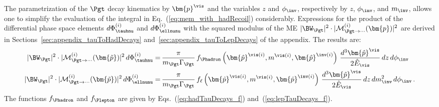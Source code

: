 The parametrization of the $\Pgt$ decay kinematics by $\bm{p}^{\vis}$
and the variables $z$ and $\phi_{\inv}$, respectively by $z$, $\phi_{\inv}$, and $m_{\inv}$,
allows one to simplify the evaluation of the integral in Eq.~(\ref{eq:mem_with_hadRecoil}) considerably.
Expressions for the product of the differential phase space elements
$d\Phi^{(i)}_{\tauhnu}$  and $d\Phi^{(i)}_{\ellnunu}$ with the squared
modulus of the ME $\vert \BW_{\Pgt} \vert^{2} \cdot \vert \mathcal{M}^{(i)}_{\Pgt\to\cdots}(\bm{p}) \vert^{2}$ are derived in Sections~\ref{sec:appendix_tauToHadDecays} and~\ref{sec:appendix_tauToLepDecays} of the appendix.
The results are:
\begin{align}
\vert \BW_{\Pgt} \vert^{2} \cdot \vert \mathcal{M}^{(i)}_{\Pgt\to\cdots}(\bm{\tilde{p}}) \vert^{2} \, d\Phi^{(i)}_{\tauhnu} 
 = & \, \frac{\pi}{m_{\Pgt}\Gamma_{\Pgt}} \,
 f_{\Phadron}\left(\bm{\hat{p}}^{\vis(i)}, m^{\vis(i)},
   \bm{\hat{p}}^{\inv(i)}\right) \, \frac{d^{3}\bm{\hat{p}}^{\vis}}{2 \hat{E}_{\vis}} \, dz \, d\phi_{\inv} \nonumber \\
\vert \BW_{\Pgt} \vert^{2} \cdot \vert \mathcal{M}^{(i)}_{\Pgt\to\cdots}(\bm{\tilde{p}}) \vert^{2} \, d\Phi^{(i)}_{\ellnunu} 
 = & \, \frac{\pi}{m_{\Pgt}\Gamma_{\Pgt}} \, f_{\ell}\left(\bm{\hat{p}}^{\vis(i)},
 m^{\vis(i)}, \bm{\hat{p}}^{\inv(i)}\right) \, \frac{d^{3}\bm{\hat{p}}^{\vis}}{2 \hat{E}_{\vis}} \, dz \, dm^{2}_{\inv} \, d\phi_{\inv}
 \, .
\label{eq:PSint}
\end{align}
The functions $f_{\Phadron}$ and $f_{\Plepton}$ are given by
Eqs.~(\ref{eq:hadTauDecays_f})
and~(\ref{eq:lepTauDecays_f}).

